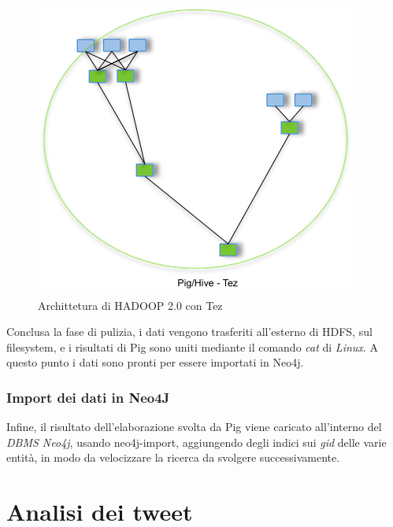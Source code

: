 \documentclass[12pt, a4paper, twocolumn]{article} %
\begin{document}
\begin{figure}
	\centering
	\includegraphics{tez.png}
	\caption{Archittetura di HADOOP 2.0 con Tez}
\end{figure}

Conclusa la fase di pulizia, i dati vengono trasferiti all'esterno di HDFS, sul filesystem, e i risultati di Pig sono uniti mediante il comando \textit{cat} di \textit{Linux}. 
A questo punto i dati sono pronti per essere importati in Neo4j.


\section{Import dei dati in Neo4J}

Infine, il risultato dell'elaborazione svolta da Pig viene caricato all'interno del \textit{DBMS Neo4j}, usando neo4j-import, aggiungendo degli indici sui \textit{gid} delle varie entità, in modo da velocizzare la ricerca da svolgere successivamente.

\hfill
\newpage
\part{Analisi dei tweet}
\end{document}
